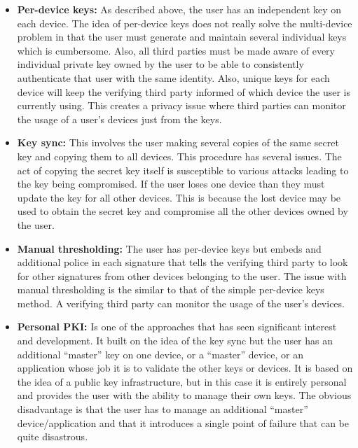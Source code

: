 \begin{itemize}

	\item \textbf{Per-device keys:} As described above, the user has an independent key on each device. The idea of per-device keys does not 				really solve the multi-device problem in that the user must generate and maintain several individual keys which is cumbersome. Also, all third 				parties must be made aware of every individual private key owned by the user to be able to consistently authenticate that user with the same 			identity. Also, unique keys for each device will keep the verifying third party informed of which device the user is currently using. This creates a 			privacy issue where third parties can monitor the usage of a user's devices just from the keys.\\

	\item \textbf{Key sync:} This involves the user making several copies of the same secret key and copying them to all devices. This procedure 				has several issues. The act of copying the secret key itself is susceptible to various attacks leading to the key being compromised. If the user 			loses one device than they must update the key for all other devices. This is because the lost device may be used to obtain the secret key and 			compromise all the other devices owned by the user.\\

	\item \textbf{Manual thresholding:} The user has per-device keys but embeds and additional police in each signature that tells the verifying 				third party to look for other signatures from other devices belonging to the user. The issue with manual thresholding is the similar to that of 				the simple per-device keys method. A verifying third party can monitor the usage of the user's devices.\\

	\item \textbf{Personal PKI:} Is one of the approaches that has seen significant interest and development. It built on the idea of the key sync 				but the user has an additional ``master'' key on one device, or a ``master'' device, or an application whose job it is to validate the other keys 			or devices. It is based on the idea of a public key infrastructure, but in this case it is entirely personal and provides the user with the 							ability to manage their own keys. The obvious disadvantage is that the user has to manage an additional ``master'' device/application and that it 	introduces a single point of failure that can be quite disastrous.\\


\end{itemize}
